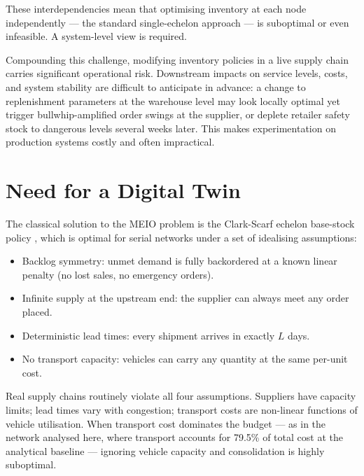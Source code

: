 These interdependencies mean that optimising inventory at each node
independently — the standard single-echelon approach — is suboptimal
or even infeasible.  A system-level view is required.

Compounding this challenge, modifying inventory policies in a live supply
chain carries significant operational risk.  Downstream impacts on service
levels, costs, and system stability are difficult to anticipate in advance:
a change to replenishment parameters at the warehouse level may look locally
optimal yet trigger bullwhip-amplified order swings at the supplier, or
deplete retailer safety stock to dangerous levels several weeks later.  This
makes experimentation on production systems costly and often impractical.

\section{Need for a Digital Twin}
\label{sec:intro:dt}

The classical solution to the MEIO problem is the Clark-Scarf echelon
base-stock policy \citep{ClarkScarf1960}, which is optimal for serial
networks under a set of idealising assumptions:

\begin{itemize}
  \item Backlog symmetry: unmet demand is fully backordered at a known
        linear penalty (no lost sales, no emergency orders).
  \item Infinite supply at the upstream end: the supplier can always
        meet any order placed.
  \item Deterministic lead times: every shipment arrives in exactly
        $L$ days.
  \item No transport capacity: vehicles can carry any quantity at
        the same per-unit cost.
\end{itemize}

Real supply chains routinely violate all four assumptions.  Suppliers have
capacity limits; lead times vary with congestion; transport costs are
non-linear functions of vehicle utilisation.  When transport cost dominates
the budget — as in the network analysed here, where transport accounts for
79.5\% of total cost at the analytical baseline — ignoring vehicle capacity
and consolidation is highly suboptimal.

